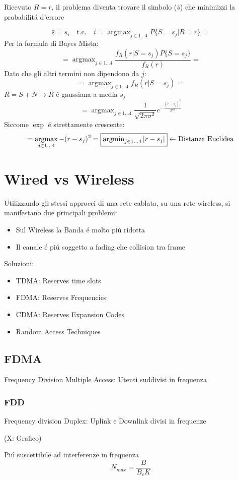 \documentclass{article}
\DeclareMathOperator*{\argmax}{argmax}
\DeclareMathOperator*{\argmin}{argmin}
\begin{document}
Ricevuto $R=r$, il problema diventa trovare il simbolo ($\bar{s}$) che minimizzi la probabilit\'a d'errore

\[ \bar{s} = s_i \quad \text{t.c.} \quad i = \argmax_{j \in 1\ldots 4} P\{ S=s_j \big| R=r\}  = \]
Per la formula di Bayes Mista:
\[= \argmax_{j \in 1\ldots 4} \frac{f_R(r | S=s_j) P\{ S=s_j\}}{f_R(r)} =\]
Dato che gli altri termini non dipendono da $j$:
\[= \argmax_{j \in 1\ldots 4} f_R(r|S=s_j) =\]
$R = S+N \rightarrow R$ \'e gaussiana a media $s_j$
\[ = \argmax_{j \in 1\ldots 4} \frac{1}{\sqrt{2\pi\sigma^2}} e^{-\frac{(r - s_j)^2}{2\sigma^2}} \]
Siccome $\exp$ \'e strettamente crescente:
\[= \argmax_{j \in 1\ldots 4} -(r - s_j)^2 = \framebox{$\argmin_{j \in 1 \ldots 4} | r - s_j |$} \leftarrow\text{Distanza Euclidea}\]

\section{Wired vs Wireless}
Utilizzando gli stessi approcci di una rete cablata, su una rete wireless, si manifestano due principali problemi:
\begin{itemize}
    \item Sul Wireless la Banda \'e molto pi\'u ridotta
    \item Il canale \'e pi\'u soggetto a fading che collision tra frame
\end{itemize}

Soluzioni:
\begin{itemize}
    \item TDMA: Reserves time slots
    \item FDMA: Reserves Frequencies
    \item CDMA: Reserves Expansion Codes
    \item Random Access Techniques
\end{itemize}

\subsection{FDMA}
Frequency Division Multiple Access: Utenti suddivisi in frequenza
\subsubsection{FDD}
Frequency division Duplex: Uplink e Downlink divisi in frequenze

(X: Grafico)

Pi\'u suscettibile ad interferenze in frequenza
\[ N_{\textit{max}} = \frac{B}{B_c K} \]
\end{document}
